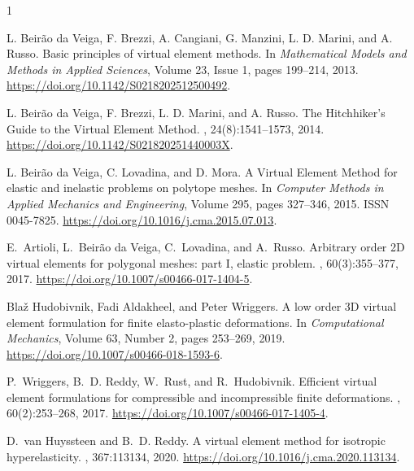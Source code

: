 \documentclass{article}
\begin{document}
\begin{thebibliography}{1}

L. Beirão da Veiga, F. Brezzi, A. Cangiani, G. Manzini, L. D. Marini, and A. Russo.
\newblock Basic principles of virtual element methods.
\newblock In {\em Mathematical Models and Methods in Applied Sciences}, Volume 23, Issue 1, pages 199--214, 2013.
\newblock \url{https://doi.org/10.1142/S0218202512500492}.

L. Beir\~{a}o da Veiga, F. Brezzi, L. D. Marini, and A. Russo.
\newblock The Hitchhiker's Guide to the Virtual Element Method.
, 24(8):1541--1573, 2014.
\newblock \url{https://doi.org/10.1142/S021820251440003X}.

L. Beirão da Veiga, C. Lovadina, and D. Mora.
\newblock A Virtual Element Method for elastic and inelastic problems on polytope meshes.
\newblock In {\em Computer Methods in Applied Mechanics and Engineering}, Volume 295, pages 327--346, 2015.
\newblock ISSN 0045-7825.
\newblock \url{https://doi.org/10.1016/j.cma.2015.07.013}.

E.~Artioli, L.~Beir\~{a}o da Veiga, C.~Lovadina, and A.~Russo.
\newblock Arbitrary order 2D virtual elements for polygonal meshes: part I, elastic problem.
, 60(3):355--377, 2017.
\newblock \url{https://doi.org/10.1007/s00466-017-1404-5}.

Blaž Hudobivnik, Fadi Aldakheel, and Peter Wriggers.
\newblock A low order 3D virtual element formulation for finite elasto-plastic deformations.
\newblock In {\em Computational Mechanics}, Volume 63, Number 2, pages 253--269, 2019.
\newblock \url{https://doi.org/10.1007/s00466-018-1593-6}.

P.~Wriggers, B.~D. Reddy, W.~Rust, and R.~Hudobivnik.
\newblock Efficient virtual element formulations for compressible and incompressible finite deformations.
, 60(2):253--268, 2017.
\newblock \url{https://doi.org/10.1007/s00466-017-1405-4}.

D.~van Huyssteen and B.~D. Reddy.
\newblock A virtual element method for isotropic hyperelasticity.
, 367:113134, 2020.
\newblock \url{https://doi.org/10.1016/j.cma.2020.113134}.


\end{thebibliography}
\end{document}
